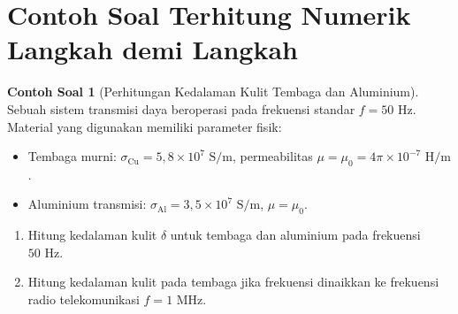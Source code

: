 \documentclass[11pt,a4paper]{article}
\theoremstyle{definition}
\newtheorem{example}{Contoh Soal}[section]
\begin{document}
\section{Contoh Soal Terhitung Numerik Langkah demi Langkah}

\begin{example}[Perhitungan Kedalaman Kulit Tembaga dan Aluminium]
Sebuah sistem transmisi daya beroperasi pada frekuensi standar $f = 50\text{ Hz}$. Material yang digunakan memiliki parameter fisik:
\begin{itemize}[leftmargin=*]
    \item Tembaga murni: $\sigma_{\text{Cu}} = 5{,}8 \times 10^7\text{ S/m}$, permeabilitas $\mu = \mu_0 = 4\pi \times 10^{-7}\text{ H/m}$.
    \item Aluminium transmisi: $\sigma_{\text{Al}} = 3{,}5 \times 10^7\text{ S/m}$, $\mu = \mu_0$.
\end{itemize}
\begin{enumerate}[leftmargin=*]
    \item Hitung kedalaman kulit $\delta$ untuk tembaga dan aluminium pada frekuensi $50\text{ Hz}$.
    \item Hitung kedalaman kulit pada tembaga jika frekuensi dinaikkan ke frekuensi radio telekomunikasi $f = 1\text{ MHz}$.
\end{enumerate}
\end{example}
\end{document}
